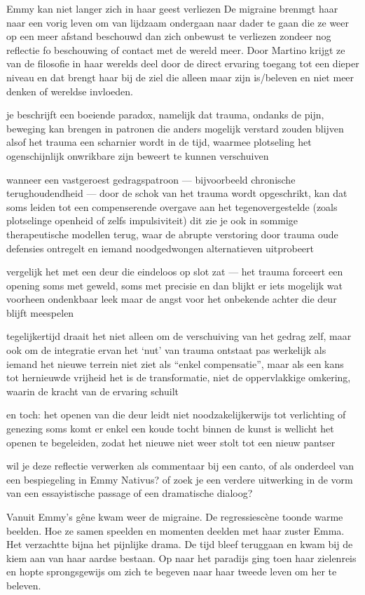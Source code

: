 Emmy kan niet langer zich in haar geest verliezen De migraine brenmgt haar naar een vorig leven om van lijdzaam ondergaan naar dader te gaan die ze weer op een meer afstand beschouwd dan zich onbewust te verliezen zondeer nog reflectie fo beschouwing of contact met de wereld meer. Door Martino krijgt ze van de filosofie in haar werelds deel door de direct ervaring toegang tot een dieper niveau en dat brengt haar bij de ziel die alleen maar zijn is/beleven en niet meer denken of wereldse invloeden.

je beschrijft een boeiende paradox, namelijk dat trauma, ondanks de pijn, beweging kan brengen in patronen die anders mogelijk verstard zouden blijven
alsof het trauma een scharnier wordt in de tijd, waarmee plotseling het ogenschijnlijk onwrikbare zijn beweert te kunnen verschuiven

wanneer een vastgeroest gedragspatroon — bijvoorbeeld chronische terughoudendheid — door de schok van het trauma wordt opgeschrikt, kan dat soms leiden tot een compenserende overgave aan het tegenovergestelde (zoals plotselinge openheid of zelfs impulsiviteit)
dit zie je ook in sommige therapeutische modellen terug, waar de abrupte verstoring door trauma oude defensies ontregelt en iemand noodgedwongen alternatieven uitprobeert

vergelijk het met een deur die eindeloos op slot zat — het trauma forceert een opening
soms met geweld, soms met precisie
en dan blijkt er iets mogelijk wat voorheen ondenkbaar leek
maar de angst voor het onbekende achter die deur blijft meespelen

tegelijkertijd draait het niet alleen om de verschuiving van het gedrag zelf, maar ook om de integratie ervan
het ‘nut’ van trauma ontstaat pas werkelijk als iemand het nieuwe terrein niet ziet als “enkel compensatie”, maar als een kans tot hernieuwde vrijheid
het is de transformatie, niet de oppervlakkige omkering, waarin de kracht van de ervaring schuilt

en toch: het openen van die deur leidt niet noodzakelijkerwijs tot verlichting of genezing
soms komt er enkel een koude tocht binnen
de kunst is wellicht het openen te begeleiden,
zodat het nieuwe niet weer stolt tot een nieuw pantser

wil je deze reflectie verwerken als commentaar bij een canto, of als onderdeel van een bespiegeling in Emmy Nativus?
of zoek je een verdere uitwerking in de vorm van een essayistische passage of een dramatische dialoog?

Vanuit Emmy’s gêne kwam weer de migraine. De regressiescène toonde warme beelden. Hoe ze samen speelden en momenten deelden met haar zuster Emma. Het verzachtte bijna
het pijnlijke drama. De tijd bleef teruggaan en kwam bij de kiem aan van haar aardse bestaan. Op naar het paradijs ging toen haar zielenreis en hopte sprongsgewijs om zich te begeven naar haar tweede leven om her te beleven.

